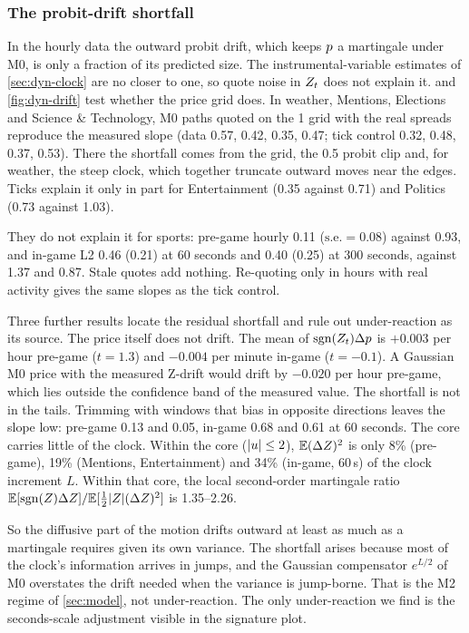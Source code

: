 \subsubsection{The probit-drift shortfall}\label{sec:dyn-res-drift}

In the hourly data the outward probit drift, which keeps $p$ a martingale under M0, is only a
fraction of its predicted size. The instrumental-variable estimates of \cref{sec:dyn-clock} are no
closer to one, so quote noise in $Z_t$ does not explain it.  and
\cref{fig:dyn-drift} test whether the price grid does.
In weather, Mentions, Elections and Science \& Technology,
  M0 paths quoted on the 1\cents{} grid with the real spreads reproduce the measured slope (data
  0.57, 0.42, 0.35, 0.47; tick control 0.32, 0.48, 0.37, 0.53). There the shortfall comes from the
  grid, the 0.5\cents{} probit clip and, for weather, the steep clock, which together truncate
  outward moves near the edges.
Ticks explain it only in part for Entertainment (0.35 against
  0.71) and Politics (0.73 against 1.03).

They do not explain it for sports: pre-game hourly
  0.11 ($\text{s.e.}=0.08$) against 0.93, and in-game L2 0.46 (0.21) at 60 seconds and 0.40 (0.25)
  at 300 seconds, against 1.37 and 0.87.
Stale quotes add nothing. Re-quoting only in hours with real activity gives the same
  slopes as the tick control.

Three further results locate the residual shortfall and rule out under-reaction as its source.
The price itself does not drift. The mean of $\operatorname{sgn}(Z_t)\Delta p$ is
  $+0.003$\cents{} per hour pre-game ($t=1.3$) and $-0.004$\cents{} per minute in-game ($t=-0.1$).
  A Gaussian M0 price with the measured Z-drift would drift by $-0.020$\cents{} per hour pre-game,
  which lies outside the confidence band of the measured value.
The shortfall is not in the tails. Trimming with windows that bias in opposite
  directions leaves the slope low: pre-game 0.13 and 0.05, in-game 0.68 and 0.61 at 60 seconds.
The core carries little of the clock. Within the core ($|u|\le2$),
  $\mathbb{E}(\Delta Z)^2$ is only 8\% (pre-game), 19\% (Mentions, Entertainment) and 34\% (in-game, 60\,s)
  of the clock increment $L$. Within that core, the local second-order martingale ratio
  $\mathbb{E}[\operatorname{sgn}(Z)\Delta Z]/\mathbb{E}[\tfrac12|Z|(\Delta Z)^2]$ is 1.35--2.26.

So the diffusive part of the motion drifts outward at least as much as a martingale requires given
its own variance. The shortfall arises because most of the clock's information arrives in jumps,
and the Gaussian compensator $e^{L/2}$ of M0 overstates the drift needed when the variance is
jump-borne. That is the M2 regime of \cref{sec:model}, not under-reaction. The only under-reaction
we find is the seconds-scale adjustment visible in the signature plot.

